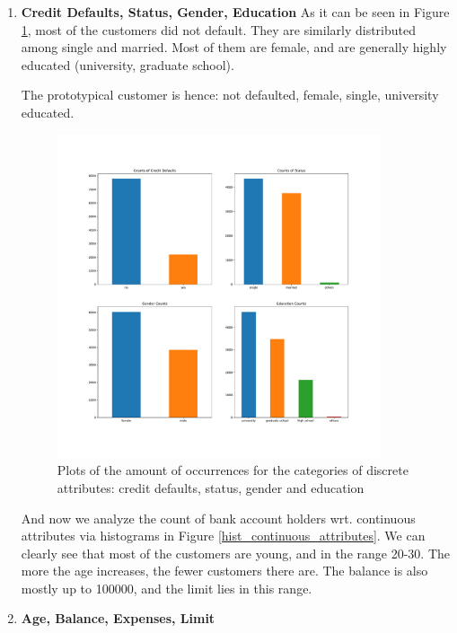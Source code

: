 \documentclass[a4paper]{article}
\begin{document}
\begin{enumerate}
	\item \textbf{Credit Defaults, Status, Gender, Education}
	As it can be seen in Figure \ref{count_default_status_gender_education}, most of the customers did not default. They are similarly distributed among single and married. Most of them are female, and are generally highly educated (university, graduate school). 
	
	The prototypical customer is hence: not defaulted, female, single, university educated. 
	
	
\begin{center}
\begin{figure}

\includegraphics[width=0.9\textwidth]{../Code/Daniele/Plots/counts_plot.pdf}
\caption{Plots of the amount of occurrences for the categories of discrete attributes: credit defaults, status, gender and education }
\label{count_default_status_gender_education}
\end{figure}
\end{center}

And now we analyze the count of bank account holders wrt. continuous attributes via histograms in Figure \ref{hist_continuous_attributes}. We can clearly see that most of the customers are young, and in the range 20-30. The more the age increases, the fewer customers there are. The balance is also mostly up to 100000, and the limit lies in this range. 
\item \textbf{Age, Balance, Expenses, Limit}


\end{enumerate}
\end{document}
